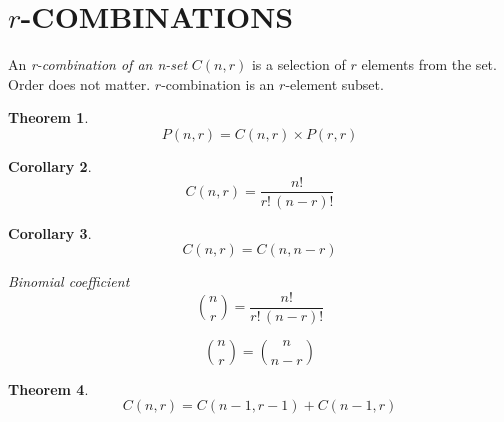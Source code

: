 \documentclass[letterpaper, 10pt]{article}
\newtheorem{thm}{Theorem}
\numberwithin{thm}{section}
\newtheorem{col}[thm]{Corollary}
\theoremstyle{definition}
\begin{document}
\setcounter{section}{6}
\section{$r$-\uppercase{combinations}}
An \textit{r-combination of an n-set} $C(n, r)$ is a selection of $r$ elements from the set. Order
does not matter. $r$-combination is an $r$-element subset.
\begin{thm}
	\begin{equation*}
		P(n,r) = C(n,r) \times P(r,r)
	\end{equation*}
\end{thm}

\begin{col}
	\begin{equation}
		C(n,r) = \frac{n!}{r!\,(n-r)!}
	\end{equation}
\end{col}

\begin{col}
	\begin{equation*}
		C(n,r)=C(n,n-r)
	\end{equation*}
\end{col}

\emph{Binomial coefficient}
\begin{equation*}
	\binom{n}{r} = \frac{n!}{r!\,(n-r)!}
\end{equation*}

\begin{equation*}
	\binom{n}{r} = \binom{n}{n-r} 
\end{equation*}

\begin{thm}
	\begin{equation*}
		C(n,r)=C(n-1,r-1) + C(n-1,r)
	\end{equation*}
\end{thm}
\end{document}
